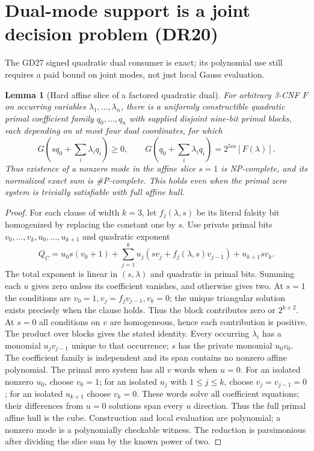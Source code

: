 \documentclass[11pt]{article}
\newtheorem{lemma}[theorem]{Lemma}
\begin{document}
\section{Dual-mode support is a joint decision problem (DR20)}\label{sec:dr20}
The GD27 signed quadratic dual consumer is exact; its polynomial use still requires a paid bound on joint modes, not just local Gauss evaluation.
\begin{lemma}[Hard affine slice of a factored quadratic dual]\label{lem:dr20-slice}
For arbitrary 3-CNF $F$ on occurring variables $\lambda_1,\ldots,\lambda_n$, there is a uniformly constructible quadratic primal coefficient family $q_0,\ldots,q_n$ with supplied disjoint nine-bit primal blocks, each depending on at most four dual coordinates, for which
\[
G\left(sq_0+\sum_i\lambda_i q_i\right)\ge0,\qquad
G\left(q_0+\sum_i\lambda_i q_i\right)=2^{5m}[F(\lambda)].
\]
Thus existence of a nonzero mode in the affine slice $s=1$ is NP-complete, and its normalized exact sum is \#P-complete. This holds even when the primal zero system is trivially satisfiable with full affine hull.
\end{lemma}
\begin{proof}
For each clause of width $k=3$, let $f_j(\lambda,s)$ be its literal falsity bit homogenized by replacing the constant one by $s$. Use private primal bits $v_0,\ldots,v_k,u_0,\ldots,u_{k+1}$ and quadratic exponent
\[
Q_C=u_0s(v_0+1)+\sum_{j=1}^k u_j(sv_j+f_j(\lambda,s)v_{j-1})+u_{k+1}sv_k.
\]
The total exponent is linear in $(s,\lambda)$ and quadratic in primal bits. Summing each $u$ gives zero unless its coefficient vanishes, and otherwise gives two. At $s=1$ the conditions are $v_0=1,v_j=f_jv_{j-1},v_k=0$; the unique triangular solution exists precisely when the clause holds. Thus the block contributes zero or $2^{k+2}$. At $s=0$ all conditions on $v$ are homogeneous, hence each contribution is positive. The product over blocks gives the stated identity. Every occurring $\lambda_i$ has a monomial $u_jv_{j-1}$ unique to that occurrence; $s$ has the private monomial $u_0v_0$. The coefficient family is independent and its span contains no nonzero affine polynomial. The primal zero system has all $v$ words when $u=0$. For an isolated nonzero $u_0$, choose $v_0=1$; for an isolated $u_j$ with $1\le j\le k$, choose $v_j=v_{j-1}=0$; for an isolated $u_{k+1}$ choose $v_k=0$. These words solve all coefficient equations; their differences from $u=0$ solutions span every $u$ direction. Thus the full primal affine hull is the cube. Construction and local evaluation are polynomial; a nonzero mode is a polynomially checkable witness. The reduction is parsimonious after dividing the slice sum by the known power of two.
\end{proof}
\end{document}
